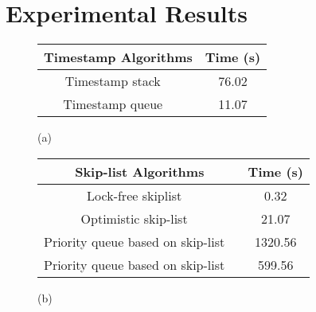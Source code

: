 \section{Experimental Results}
\label{section:experiments}
\newcommand{\emm}{(emm)}
\begin{figure}[]
\center



\begin{tabular}{|c | c | }
  \hline
   \textsf{\textbf{{Timestamp Algorithms}}} &  \textsf{\textbf{{Time (s)}}} \\
\hline
\hline
\textsf{Timestamp stack  ~\cite{MS:QueueAlgorithms}}\;\;\;\;\;\;  & \textsf{76.02} \\
\hline
\textsf{Timestamp queue  ~\cite{MS:QueueAlgorithms}}& \textsf{11.07} \\
\hline
\end{tabular}

\vspace*{0.1cm}

(a)
\\
\vspace*{0.5cm}

\begin{tabular}{|c | c | }
  \hline
   \textsf{\textbf{{Skip-list Algorithms}}} &  \textsf{\textbf{{Time (s)}}} \\
\hline
\hline
\;\;\;\;\textsf{Lock-free skiplist   ~\cite{ArtOfMpP}}\;\;\;\;\;\;  & \textsf{0.32} \\
\hline
\textsf{Optimistic skip-list  ~\cite{MS:QueueAlgorithms}}& \textsf{21.07} \\
\hline 
\textsf{Priority queue based on skip-list  ~\cite{Shavit:ElimQueue}}  &  \textsf{1320.56} \\
\hline
\textsf{Priority queue based on skip-list  ~\cite{Shavit:ElimQueue}}  &  \textsf{599.56} \\
\hline
\end{tabular}

\vspace*{0.1cm}

(b)
\\
\vspace*{0.5cm}



\end{figure}
